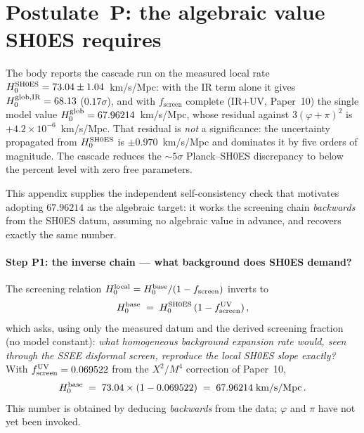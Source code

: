 \documentclass[12pt,a4paper]{article}
\newcommand{\phiG}{\varphi}
\newcommand{\fsc}{f_{\mathrm{screen}}}
\begin{document}
\appendix
\section{Postulate~P: the algebraic value SH0ES requires}
\label{app:postulateP}

The body reports the cascade run on the measured local rate
$H_0^{\rm SH0ES}=73.04\pm1.04$~km/s/Mpc: with the IR term alone it gives
$H_0^{\rm glob,IR}=68.13$ ($0.17\sigma$), and with $\fsc$ complete (IR${+}$UV,
Paper~10) the single model value $H_0^{\rm glob}=67.96214$~km/s/Mpc, whose
residual against $3(\phiG+\pi)^2$ is $+4.2\times10^{-6}$~km/s/Mpc. That residual
is \emph{not} a significance: the uncertainty propagated from
$H_0^{\rm SH0ES}$ is $\pm0.970$~km/s/Mpc and dominates it by five orders of
magnitude. The cascade reduces the $\sim 5\sigma$ Planck--SH0ES discrepancy to
below the percent level with zero free parameters.

This appendix supplies the independent self-consistency check that motivates
adopting $67.96214$ as the algebraic target: it works the screening chain
\emph{backwards} from the SH0ES datum, assuming no algebraic value in advance,
and recovers exactly the same number.

\paragraph{Step P1: the inverse chain --- what background does SH0ES demand?}
The screening relation $H_0^{\rm local}=H_0^{\rm base}/(1-\fsc)$ inverts to
\begin{equation}
  H_0^{\rm base} \;=\; H_0^{\rm SH0ES}\,(1-\fsc^{\rm UV})\,,
  \label{eq:inverse_chain}
\end{equation}
which asks, using only the measured datum and the derived screening fraction
(no model constant): \emph{what homogeneous background expansion rate would,
seen through the SSEE disformal screen, reproduce the local SH0ES slope
exactly?} With $\fsc^{\rm UV}=0.069522$ from the $X^2/M^4$ correction of
Paper~10,
\begin{equation}
  H_0^{\rm base} \;=\; 73.04 \times (1 - 0.069522)
                 \;=\; 67.96214\;\text{km/s/Mpc}\,.
  \label{eq:Hbase_value}
\end{equation}
This number is obtained by deducing \emph{backwards} from the data; $\phiG$ and
$\pi$ have not yet been invoked.
\end{document}

